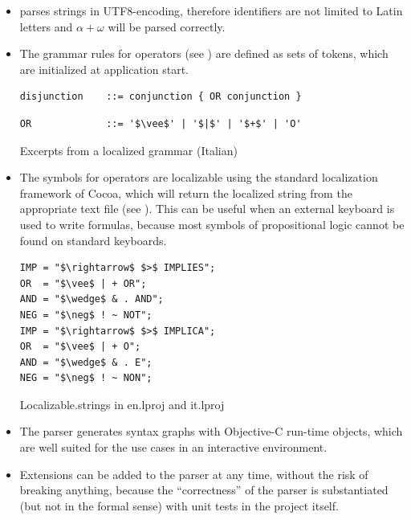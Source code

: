 \begin{itemize}

\item \Nyaya parses strings in UTF8-encoding, 
therefore identifiers are not limited to Latin letters and
$\alpha + \omega$ will be parsed correctly. 

\item The grammar rules for operators (see ) 
are defined as sets of tokens, 
which are initialized at application start. 

\begin{table}[htdp]
\begin{center}
\begin{lstlisting}[mathescape,firstnumber=7, xleftmargin=1cm]
disjunction    ::= conjunction { OR conjunction }   
\end{lstlisting}
\begin{lstlisting}[mathescape,firstnumber=15, xleftmargin=1cm]
OR             ::= '$\vee$' | '$|$' | '$+$' | 'O'
\end{lstlisting}
\caption{Excerpts from a localized grammar (Italian)}
\label{tab:LocalizedEBNF}
\end{center}
\end{table}

\item The symbols for operators
are localizable using the standard localization framework of Cocoa,
which will return the localized string from the appropriate
text file (see ). 
This can be useful when an external keyboard is used to write formulas,
because most symbols of propositional logic cannot be found on standard keyboards.

\begin{table}[htdp]
\begin{center}
\begin{lstlisting}[mathescape,numbers=none,multicols=2, xleftmargin=1cm]
IMP = "$\rightarrow$ $>$ IMPLIES";
OR  = "$\vee$ | + OR";
AND = "$\wedge$ & . AND";
NEG = "$\neg$ ! ~ NOT";
IMP = "$\rightarrow$ $>$ IMPLICA";
OR  = "$\vee$ | + O";
AND = "$\wedge$ & . E";
NEG = "$\neg$ ! ~ NON";
\end{lstlisting}
\caption{Localizable.strings in en.lproj and it.lproj}
\label{tab:LocalizableStrings}
\end{center}
\end{table}


\item The parser generates syntax graphs with Objective-C run-time objects,
which are well suited for the use cases in an interactive environment.

\item 
Extensions can be added to the parser at any time, without the risk of breaking anything,
because the “correctness” of the parser is substantiated (but not in the formal sense) 
with unit tests in the project itself. 


\end{itemize}

